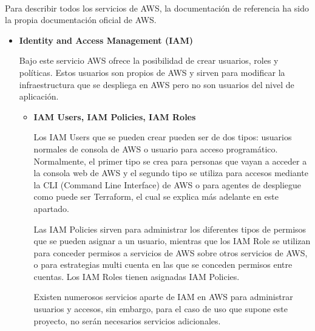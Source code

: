 \documentclass[../../memoria.tex]{subfiles}
\begin{document}
\paragraph{}
Para describir todos los servicios de AWS, la documentación de referencia ha sido la propia documentación oficial de AWS. \cite{awsdoc}
\begin{itemize}
      \item \textbf{Identity and Access Management (IAM)}
            \par
            Bajo este servicio AWS ofrece la posibilidad de crear usuarios, roles y políticas. Estos usuarios son propios de AWS y sirven para modificar la infraestructura que se despliega en AWS pero no son usuarios del nivel de aplicación.
            \begin{itemize}
                  \item \textbf{IAM Users, IAM Policies, IAM Roles}
                        \par
                        Los IAM Users que se pueden crear pueden ser de dos tipos: usuarios normales de consola de AWS o usuario para acceso programático. Normalmente, el primer tipo se crea para personas que vayan a acceder a la consola web de AWS y el segundo tipo se utiliza para accesos mediante la CLI (Command Line Interface) de AWS o para agentes de despliegue como puede ser Terraform, el cual se explica más adelante en este apartado.
                        \par
                        Las IAM Policies sirven para administrar los diferentes tipos de permisos que se pueden asignar a un usuario, mientras que los IAM Role se utilizan para conceder permisos a servicios de AWS sobre otros servicios de AWS, o para estrategias multi cuenta en las que se conceden permisos entre cuentas. Los IAM Roles tienen asignadas IAM Policies.
                        \par
                        Existen numerosos servicios aparte de IAM en AWS para administrar usuarios y accesos, sin embargo, para el caso de uso que supone este proyecto, no serán necesarios servicios adicionales.
            \end{itemize}


\end{itemize}
\end{document}
